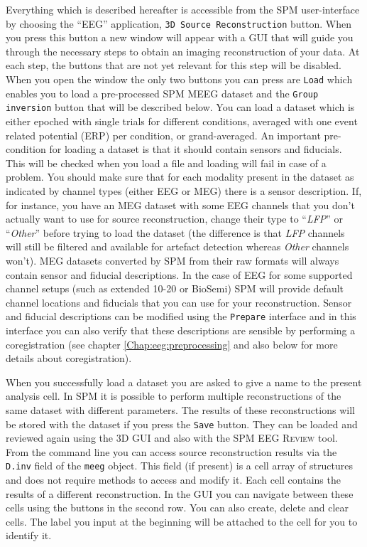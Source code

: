Everything which is described hereafter is accessible from the SPM user-interface by choosing the ``EEG'' application, \texttt{3D Source Reconstruction} button. When you press this button a new window will appear with a GUI that will guide you through the necessary steps to obtain an imaging reconstruction of your data. At each step, the buttons that are not yet relevant for this step will be disabled. When you open the window the only two buttons you can press are \texttt{Load} which enables you to load a pre-processed SPM MEEG dataset and the \texttt{Group inversion} button that will be described below. You can load a dataset which is either epoched with single trials for different conditions, averaged with one event related potential (ERP) per condition, or grand-averaged. An important pre-condition for loading a dataset is that it should contain sensors and fiducials. This will be checked when you load a file and loading will fail in case of a problem. You should make sure that for each modality present in the dataset as indicated by channel types (either EEG or MEG) there is a sensor description. If, for instance, you have an MEG dataset with some EEG channels that you don't actually want to use for source reconstruction, change their type to ``\textit{LFP}'' or ``\textit{Other}'' before trying to load the dataset (the difference is that \textit{LFP} channels will still be filtered and available for artefact detection whereas \textit{Other} channels won't). MEG datasets converted by SPM from their raw formats will always contain sensor and fiducial descriptions. In the case of EEG for some supported channel setups (such as extended 10-20 or BioSemi) SPM will provide default channel locations and fiducials that you can use for your reconstruction. Sensor and fiducial descriptions can be modified using the \texttt{Prepare} interface and in this interface you can also verify that these descriptions are sensible by performing a coregistration (see chapter \ref{Chap:eeg:preprocessing} and also below for more details about coregistration).

When you successfully load a dataset you are asked to give a name to the present analysis cell. In SPM it is possible to perform multiple reconstructions of the same dataset with different parameters. The results of these reconstructions will be stored with the dataset if you press the \texttt{Save} button. They can be loaded and reviewed again using the 3D GUI and also with the SPM EEG \textsc{Review} tool. From the command line you can access source reconstruction results via the \texttt{D.inv} field of the \texttt{meeg} object. This field (if present) is a cell array of structures and does not require methods to access and modify it. Each cell contains the results of a different reconstruction. In the GUI you can navigate between these cells using the buttons in the second row. You can also create, delete and clear cells. The label you input at the beginning will be attached to the cell for you to identify it.


